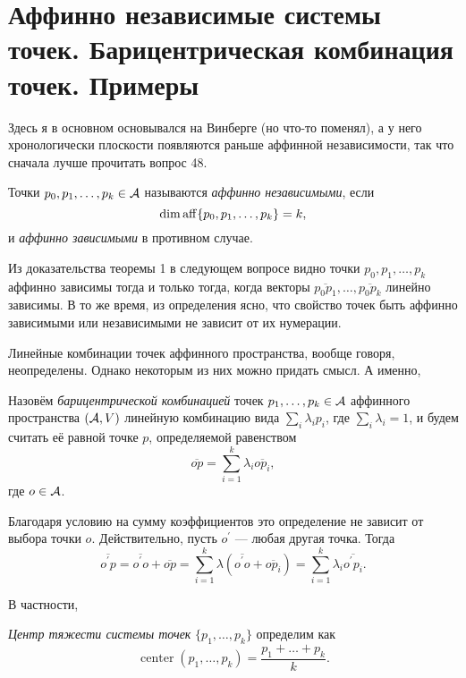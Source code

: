 \section{Аффинно независимые системы точек. Барицентрическая комбинация точек. Примеры}

Здесь я в основном основывался на Винберге (но что-то поменял), а у него хронологически плоскости появляются раньше аффинной независимости, так что сначала лучше прочитать вопрос 48.

\begin{definition}
    Точки $p_0, p_1, \ldots, p_k \in \mathcal{A}$ называются \textit{аффинно независимыми}, если \[\dim\operatorname{aff}\{p_0, p_1, \ldots, p_k\} = k,\] и \textit{аффинно зависимыми} в противном случае.
\end{definition}

Из доказательства теоремы 1 в следующем вопросе видно точки $p_0, p_1, \ldots, p_k$ аффинно зависимы тогда и только тогда, когда векторы $\overline{p_0p_1}, \ldots, \overline{p_0p_k}$ линейно зависимы. В то же время, из определения ясно, что свойство точек быть аффинно зависимыми или независимыми не зависит от их нумерации.

Линейные комбинации точек аффинного пространства, вообще говоря, неопределены. Однако некоторым из них можно придать смысл. А именно,

\begin{definition}
    Назовём \textit{барицентрической комбинацией} точек $p_1, \ldots, p_k \in \mathcal{A}$ аффинного пространства $(\mathcal{A}, V)$ линейную комбинацию вида $\sum\limits_i\lambda_ip_i$, где $\sum\limits_i\lambda_i = 1$, и будем считать её равной точке $p$, определяемой равенством
    \[
        \overline{op} = \sum_{i = 1}^k\lambda_i\overline{op_i},
    \]
    где $o \in \mathcal{A}$.
\end{definition}

Благодаря условию на сумму коэффициентов это определение не зависит от выбора точки $o$. Действительно, пусть $o^\prime$ --- любая другая точка. Тогда
\[
    \overline{o^\prime p} = \overline{o^\prime o} + \overline{op} = \sum_{i = 1}^k\lambda(\overline{o^\prime o} + \overline{op_i}) = \sum_{i = 1}^k\lambda_i\overline{o^\prime p_i}.
\]

В частности,

\begin{definition}
    \textit{Центр тяжести системы точек} $\{p_1, \ldots, p_k\}$ определим как
    \[
        \operatorname{center}(p_1, \ldots, p_k) = \frac{p_1 + \ldots + p_k}{k}.
    \]
\end{definition}

